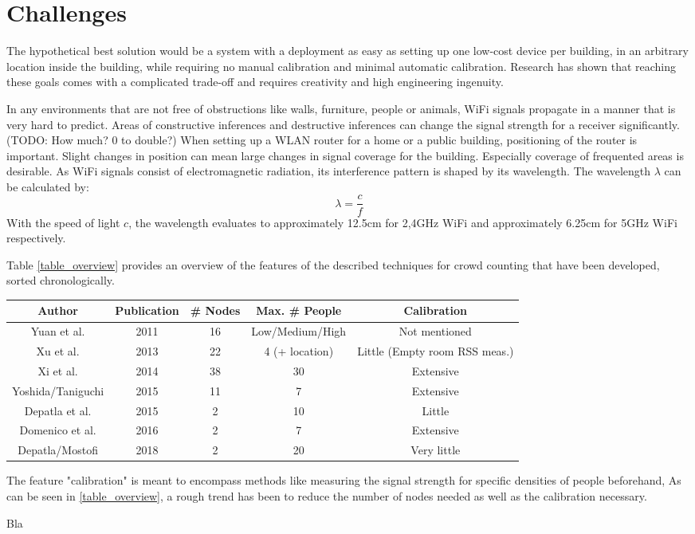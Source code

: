 \documentclass[conference]{IEEEtran}
\begin{document}
\section{Challenges}
The hypothetical best solution would be a system with a deployment as easy as setting up one low-cost device per building, in an arbitrary location inside the building, while requiring no manual calibration and minimal automatic calibration. Research has shown that reaching these goals comes with a complicated trade-off and requires creativity and high engineering ingenuity. 
\par
In any environments that are not free of obstructions like walls, furniture, people or animals, WiFi signals propagate in a manner that is very hard to predict. Areas of constructive inferences and destructive inferences can change the signal strength for a receiver significantly. (TODO: How much? 0 to double?) When setting up a WLAN router for a home or a public building, positioning of the router is important. Slight changes in position can mean large changes in signal coverage for the building. Especially coverage of frequented areas is desirable. As WiFi signals consist of electromagnetic radiation, its interference pattern is shaped by its wavelength. The wavelength $\lambda$ can be calculated by: $$\lambda = \frac{c}{f}$$ With the speed of light $c$, the wavelength evaluates to approximately 12.5cm for 2,4GHz WiFi and approximately 6.25cm for 5GHz WiFi respectively.

\par
Table \ref{table_overview} provides an overview of the features of the described techniques for crowd counting that have been developed, sorted chronologically.
\begin{table*}
\caption{Overview of techniques}
\label{table_overview}
\centering
\begin{tabular}{c || c || c || c || c}
\hline
\bfseries \textbf{Author} & \textbf{Publication} & \bfseries\textbf{\# Nodes} & \bfseries \textbf{Max. \# People} & \bfseries \textbf{Calibration} \\
\hline
Yuan et al. & 2011 & 16 & Low/Medium/High & Not mentioned \\
\hline
Xu et al. & 2013 & 22 & 4 (+ location) & Little (Empty room RSS meas.) \\
\hline
Xi et al. & 2014 & 38 & 30 & Extensive \\
\hline
Yoshida/Taniguchi & 2015 & 11 & 7 & Extensive \\
\hline
Depatla et al. & 2015 & 2 & 10 & Little \\
\hline
Domenico et al. & 2016 & 2 & 7 & Extensive \\
\hline
Depatla/Mostofi & 2018 & 2 & 20 & Very little
\end{tabular}
\end{table*}
The feature "calibration" is meant to encompass methods like measuring the signal strength for specific densities of people beforehand, 
As can be seen in \ref{table_overview}, a rough trend has been to reduce the number of nodes needed as well as the calibration necessary.
\par
Bla
\end{document}
